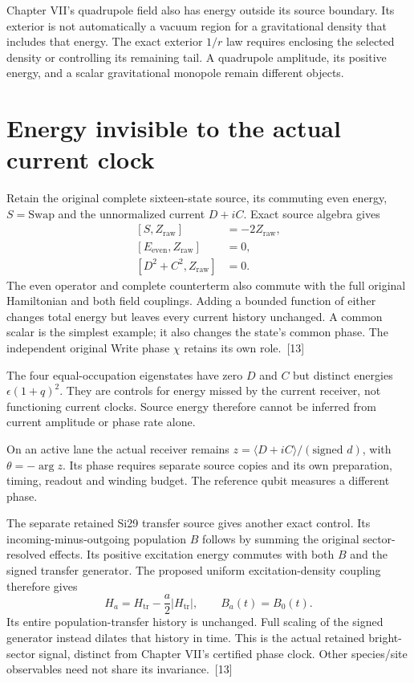 \documentclass[10pt,twocolumn,letterpaper]{article}
\begin{document}
Chapter VII's quadrupole field also has energy outside its source boundary. Its exterior is not automatically a vacuum region for a gravitational density that includes that energy. The exact exterior $1/r$ law requires enclosing the selected density or controlling its remaining tail. A quadrupole amplitude, its positive energy, and a scalar gravitational monopole remain different objects.

\section{Energy invisible to the actual current clock}
Retain the original complete sixteen-state source, its commuting even energy, \(S=\mathrm{Swap}\) and the unnormalized current \(D+iC\). Exact source algebra gives
\[
\begin{aligned}
[S,Z_{\mathrm{raw}}]&=-2Z_{\mathrm{raw}},\\
[E_{\mathrm{even}},Z_{\mathrm{raw}}]&=0,\\
[D^2+C^2,Z_{\mathrm{raw}}]&=0.
\end{aligned}
\]
The even operator and complete counterterm also commute with the full original Hamiltonian and both field couplings. Adding a bounded function of either changes total energy but leaves every current history unchanged. A common scalar is the simplest example; it also changes the state's common phase. The independent original Write phase \(\chi\) retains its own role.~[13]

The four equal-occupation eigenstates have zero \(D\) and \(C\) but distinct energies \(\epsilon(1+q)^2\). They are controls for energy missed by the current receiver, not functioning current clocks. Source energy therefore cannot be inferred from current amplitude or phase rate alone.

On an active lane the actual receiver remains \(z=\langle D+iC\rangle/(\text{signed }d)\), with \(\theta=-\arg z\). Its phase requires separate source copies and its own preparation, timing, readout and winding budget. The reference qubit measures a different phase.

The separate retained Si29 transfer source gives another exact control. Its incoming-minus-outgoing population \(B\) follows by summing the original sector-resolved effects. Its positive excitation energy commutes with both \(B\) and the signed transfer generator. The proposed uniform excitation-density coupling therefore gives
\[
H_a=H_{\mathrm{tr}}-\frac{a}{2}|H_{\mathrm{tr}}|,
\qquad B_a(t)=B_0(t).
\]
Its entire population-transfer history is unchanged. Full scaling of the signed generator instead dilates that history in time. This is the actual retained bright-sector signal, distinct from Chapter VII's certified phase clock. Other species/site observables need not share its invariance.~[13]
\end{document}
